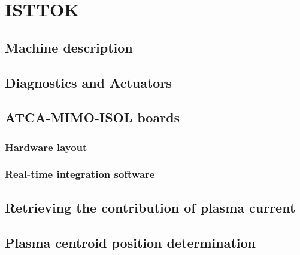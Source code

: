 \chapter{ISTTOK }

\section{Machine description}
\section{Diagnostics and Actuators}
\section{ATCA-MIMO-ISOL boards}
\subsection{Hardware layout}
\subsection{Real-time  integration software}
\section{Retrieving the contribution of plasma current }
\section{Plasma centroid position determination}